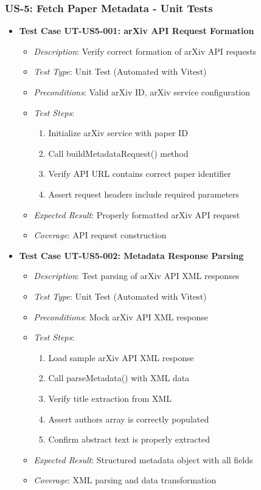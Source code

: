 \documentclass[12pt]{article}
\begin{document}
\subsubsection{US-5: Fetch Paper Metadata - Unit Tests}
\begin{itemize}
  \item \textbf{Test Case UT-US5-001: arXiv API Request Formation}
    \begin{itemize}
      \item \textit{Description}: Verify correct formation of arXiv API requests
      \item \textit{Test Type}: Unit Test (Automated with Vitest)
      \item \textit{Preconditions}: Valid arXiv ID, arXiv service configuration
      \item \textit{Test Steps}:
        \begin{enumerate}
          \item Initialize arXiv service with paper ID
          \item Call buildMetadataRequest() method
          \item Verify API URL contains correct paper identifier
          \item Assert request headers include required parameters
        \end{enumerate}
      \item \textit{Expected Result}: Properly formatted arXiv API request
      \item \textit{Coverage}: API request construction
    \end{itemize}

  \item \textbf{Test Case UT-US5-002: Metadata Response Parsing}
    \begin{itemize}
      \item \textit{Description}: Test parsing of arXiv API XML responses
      \item \textit{Test Type}: Unit Test (Automated with Vitest)
      \item \textit{Preconditions}: Mock arXiv API XML response
      \item \textit{Test Steps}:
        \begin{enumerate}
          \item Load sample arXiv API XML response
          \item Call parseMetadata() with XML data
          \item Verify title extraction from XML
          \item Assert authors array is correctly populated
          \item Confirm abstract text is properly extracted
        \end{enumerate}
      \item \textit{Expected Result}: Structured metadata object with all fields
      \item \textit{Coverage}: XML parsing and data transformation
    \end{itemize}


\end{itemize}
\end{document}
